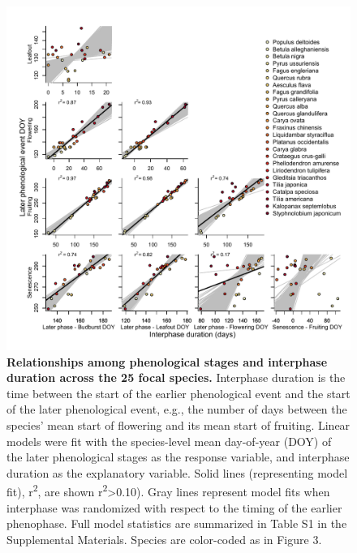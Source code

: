 \documentclass{article}
\begin{document}
\begin{figure}[h]
  \centering
  \includegraphics{../analyses/figures/Hyp2.pdf}
  \caption{\textbf{Relationships among phenological stages and interphase duration across the 25 focal species.} Interphase duration is the time between the start of the earlier phenological event and the start of the later phenological event, e.g., the number of days between the species' mean start of flowering and its mean start of fruiting. Linear models were fit with the species-level mean day-of-year (DOY) of the later phenological stages as the response variable, and interphase duration as the explanatory variable. Solid lines (representing model fit), r\textsuperscript{2}, are shown r\textsuperscript{2}>0.10). Gray lines represent model fits when interphase was randomized with respect to the timing of the earlier phenophase. Full model statistics are summarized in Table S1 in the Supplemental Materials. Species are color-coded as in Figure 3.}
  \label{fig:inter}
   \end{figure}

\end{document}
